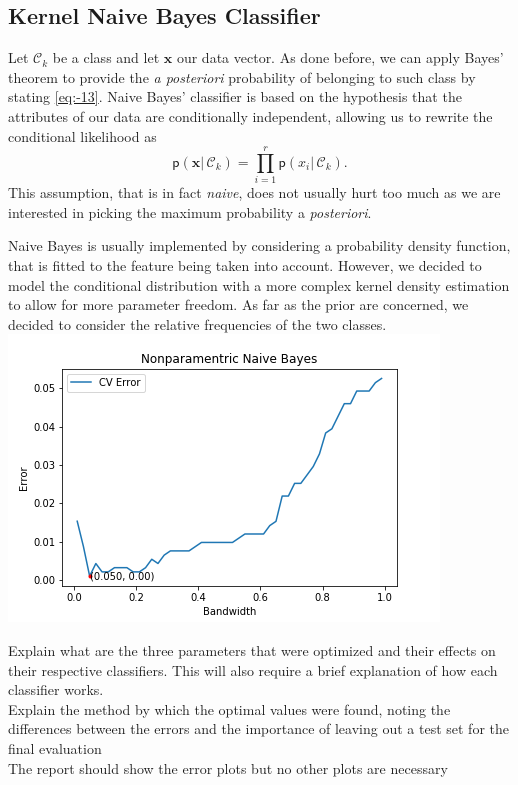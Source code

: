 \documentclass[a4paper]{article}
\begin{document}
\subsection{Kernel Naive Bayes Classifier}

Let $\mathcal{C}_{k}$ be a class and let $\mathbf{x}$ our data vector.
As done before, we can apply Bayes' theorem to provide the \textit{a
	posteriori} probability of belonging to such class by stating \ref{eq:-13}.
Naive Bayes' classifier is based on the hypothesis that the attributes
of our data are conditionally independent, allowing us to rewrite
the conditional likelihood as 
\begin{equation}
\mathsf{p}\left(\mathbf{x}|\,\mathcal{C}_{k}\right)=\prod_{i=1}^{r}\mathsf{p}\left(x_{i}|\,\mathcal{C}_{k}\right).\label{eq:-14}
\end{equation}
This assumption, that is in fact \textit{naive}, does not usually
hurt too much as we are interested in picking the maximum probability
a\textit{ posteriori}. 

Naive Bayes is usually implemented by considering a probability density
function, that is fitted to the feature being taken into account.
However, we decided to model the conditional distribution with a more
complex kernel density estimation to allow for more parameter freedom.
As far as the prior are concerned, we decided to consider the relative
frequencies of the two classes.\\

\includegraphics{Best Bandwidth - Naive Bayes.png}

Explain what are the three parameters that were optimized and their
effects on their respective classifiers. This will also require a
brief explanation of how each classifier works.\\
Explain the method by which the optimal values were found, noting
the differences between the errors and the importance of leaving out
a test set for the final evaluation\\
The report should show the error plots but no other plots are necessary\\
\end{document}
